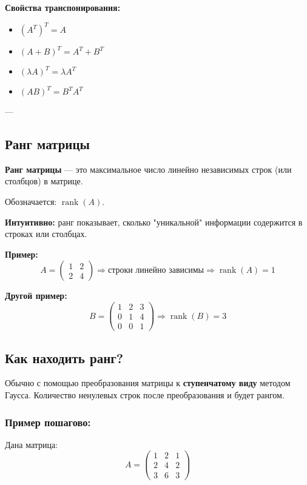 \textbf{Свойства транспонирования:}
\begin{itemize}
  \item $(A^T)^T = A$
  \item $(A + B)^T = A^T + B^T$
  \item $(\lambda A)^T = \lambda A^T$
  \item $(AB)^T = B^T A^T$
\end{itemize}

---

\subsection*{Ранг матрицы}

\textbf{Ранг матрицы} — это максимальное число линейно независимых строк (или столбцов) в матрице.

Обозначается: $\operatorname{rank}(A)$.

\textbf{Интуитивно:} ранг показывает, сколько "уникальной" информации содержится в строках или столбцах.

\textbf{Пример:}
\[
A =
\begin{pmatrix}
1 & 2 \\
2 & 4
\end{pmatrix}
\Rightarrow \text{строки линейно зависимы} \Rightarrow \operatorname{rank}(A) = 1
\]

\textbf{Другой пример:}
\[
B =
\begin{pmatrix}
1 & 2 & 3 \\
0 & 1 & 4 \\
0 & 0 & 1
\end{pmatrix}
\Rightarrow \operatorname{rank}(B) = 3
\]

\subsection*{Как находить ранг?}

Обычно с помощью преобразования матрицы к \textbf{ступенчатому виду} методом Гаусса. Количество ненулевых строк после преобразования и будет рангом.

\subsubsection*{Пример пошагово:}

Дана матрица:
\[
A =
\begin{pmatrix}
1 & 2 & 1 \\
2 & 4 & 2 \\
3 & 6 & 3
\end{pmatrix}
\]

